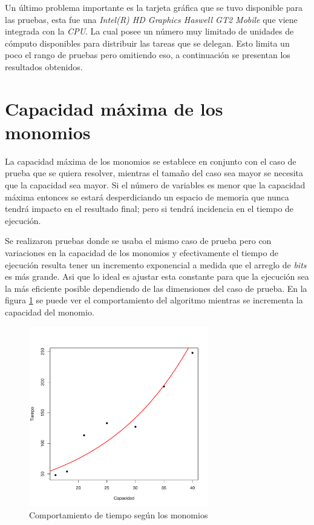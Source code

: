 Un último problema importante es la tarjeta gráfica que se tuvo disponible para las pruebas, esta fue una \textit{Intel(R) HD Graphics Haswell GT2 Mobile} que viene integrada con la \textit{CPU}. La cual posee un número muy limitado de unidades de cómputo disponibles para distribuir las tareas que se delegan. Esto limita un poco el rango de pruebas pero omitiendo eso, a continuación se presentan los resultados obtenidos.

\section{Capacidad máxima de los monomios}

La capacidad máxima de los monomios se establece en conjunto con el caso de prueba que se quiera resolver, mientras el tamaño del caso sea mayor se necesita que la capacidad sea mayor. Si el número de variables es menor que la capacidad máxima entonces se estará desperdiciando un espacio de memoria que nunca tendrá impacto en el resultado final; pero si tendrá incidencia en el tiempo de ejecución.

Se realizaron pruebas donde se usaba el mismo caso de prueba pero con variaciones en la capacidad de los monomios y efectivamente el tiempo de ejecución resulta tener un incremento exponencial a medida que el arreglo de \textit{bits} es más grande. Asi que lo ideal es ajustar esta constante para que la ejecución sea la más eficiente posible dependiendo de las dimensiones del caso de prueba. En la figura \ref{fig:time} se puede ver el comportamiento del algoritmo mientras se incrementa la capacidad del monomio.

\begin{figure}[!ht]
    \centering
    \includegraphics[width=0.7\textwidth,height=\textheight,keepaspectratio]{capacity_time.pdf}
    \caption{Comportamiento de tiempo según los monomios}
    \label{fig:time}
\end{figure}

